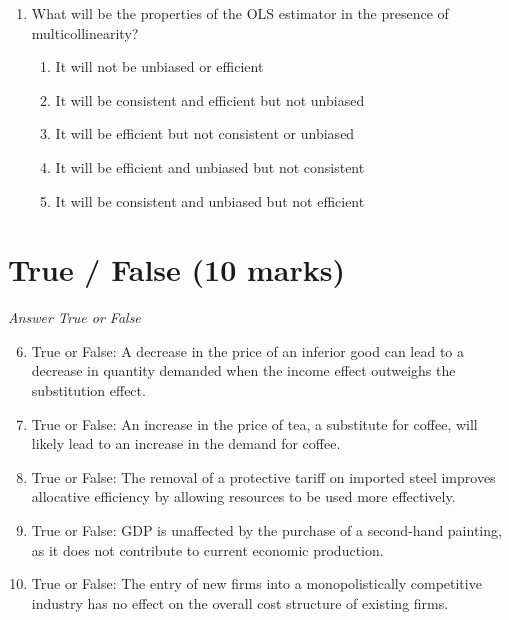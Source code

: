 \documentclass[12pt]{article}
\begin{document}
\begin{enumerate}[label=\arabic*.]
\begin{enumerate}[label=(\alph*)]
    \item Overproduction and wastage of crops
    \item Lack of alternative employment
    \item Excessive government intervention in agriculture
    \item Inefficient farming methods
    \item Low income of farmers
\end{enumerate}
\item What will be the properties of the OLS estimator in the presence of multicollinearity?
\begin{enumerate}[label=(\alph*)]
    \item It will not be unbiased or efficient
    \item It will be consistent and efficient but not unbiased
    \item It will be efficient but not consistent or unbiased
    \item It will be efficient and unbiased but not consistent
    \item It will be consistent and unbiased but not efficient
\end{enumerate}
\end{enumerate}

\section*{True / False (10 marks)}
\textit{Answer True or False}
\begin{enumerate}[label=\arabic*.]
\setcounter{enumi}{5}
\item True or False: A decrease in the price of an inferior good can lead to a decrease in quantity demanded when the income effect outweighs the substitution effect.
\item True or False: An increase in the price of tea, a substitute for coffee, will likely lead to an increase in the demand for coffee.
\item True or False: The removal of a protective tariff on imported steel improves allocative efficiency by allowing resources to be used more effectively.
\item True or False: GDP is unaffected by the purchase of a second-hand painting, as it does not contribute to current economic production.
\item True or False: The entry of new firms into a monopolistically competitive industry has no effect on the overall cost structure of existing firms.
\end{enumerate}
\end{document}
